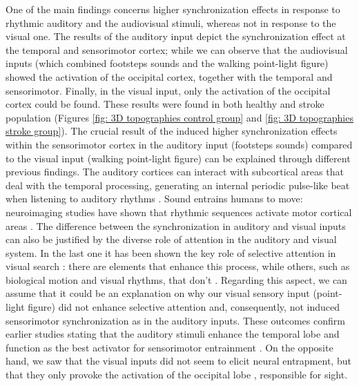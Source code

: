 One of the main findings concerns higher synchronization effects in response to rhythmic auditory and the audiovisual stimuli, whereas not in response to the visual one. The results of the auditory input depict the synchronization effect at the temporal and sensorimotor cortex; while we can observe that the audiovisual inputs (which combined footsteps sounds and the walking point-light figure) showed the activation of the occipital cortex, together with the temporal and sensorimotor. Finally, in the visual input, only the activation of the occipital cortex could be found. These results were found in both healthy and stroke population (Figures \ref{fig: 3D topographies control group} and \ref{fig: 3D topographies stroke group}).
The crucial result of the induced higher synchronization effects within the sensorimotor cortex in the auditory input (footsteps sounds) compared to the visual input (walking point-light figure) can be explained through different previous findings. 
The auditory cortices can interact with subcortical areas that deal with the temporal processing, generating an internal periodic pulse-like beat when listening to auditory rhythms \parencite{Nozaradan_2017}. Sound entrains humans to move: neuroimaging studies have shown that rhythmic sequences activate motor cortical areas \parencite{Grahn_2007}. 
The difference between the synchronization in auditory and visual inputs can also be justified by the diverse role of attention in the auditory and visual system. In the last one it has been shown the key role of selective attention in visual search \parencite{Keshvari_2016}: there are elements that enhance this process, while others, such as biological motion and visual rhythms, that don't \parencite{Wolfe_2017}. Regarding this aspect, we can assume that it could be an explanation on why our visual sensory input (point-light figure) did not enhance selective attention and, consequently, not induced sensorimotor synchronization as in the auditory inputs. 
These outcomes confirm earlier studies stating that the auditory stimuli enhance the temporal lobe and function as the best activator for sensorimotor entrainment \parencite{Thaut_1999}. On the opposite hand, we saw that the visual inputs did not seem to elicit neural entrapment, but that they only provoke the activation of the occipital lobe \parencite{Nehmad_1998}, responsible for sight. 

